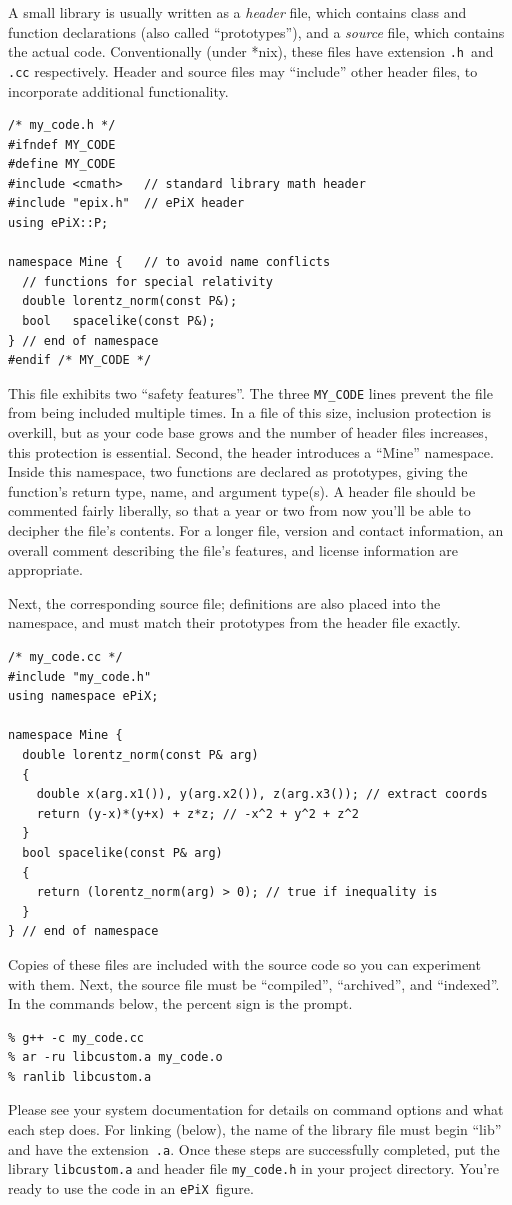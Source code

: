 \documentclass[12pt,letterpaper]{book}
\newcommand{\code}[1]{\texttt{#1}}
\newcommand{\filename}[1]{\texttt{#1}}
\newcommand{\ePiX}{\code{ePiX}}
\begin{document}
A small library is usually written as a \emph{header} file, which
contains class and function declarations (also called ``prototypes''),
and a \emph{source} file, which contains the actual
code. Conventionally (under *nix), these files have extension
\filename{.h}~and \filename{.cc} respectively. Header and source files
may ``include'' other header files, to incorporate additional
functionality.
\begin{verbatim}
/* my_code.h */
#ifndef MY_CODE
#define MY_CODE
#include <cmath>   // standard library math header
#include "epix.h"  // ePiX header
using ePiX::P;

namespace Mine {   // to avoid name conflicts
  // functions for special relativity
  double lorentz_norm(const P&);
  bool   spacelike(const P&);
} // end of namespace
#endif /* MY_CODE */
\end{verbatim}
This file exhibits two ``safety features''. The three \code{MY\_CODE}
lines prevent the file from being included multiple times. In a file
of this size, inclusion protection is overkill, but as your code base
grows and the number of header files increases, this protection is
essential. Second, the header introduces a ``Mine'' namespace. Inside
this namespace, two functions are declared as prototypes, giving the
function's return type, name, and argument type(s). A header file
should be commented fairly liberally, so that a year or two from now
you'll be able to decipher the file's contents.  For a longer file,
version and contact information, an overall comment describing the
file's features, and license information are appropriate.

Next, the corresponding source file; definitions are also placed into
the namespace, and must match their prototypes from the header file
exactly.
\begin{verbatim}
/* my_code.cc */
#include "my_code.h"
using namespace ePiX;

namespace Mine {
  double lorentz_norm(const P& arg)
  {
    double x(arg.x1()), y(arg.x2()), z(arg.x3()); // extract coords
    return (y-x)*(y+x) + z*z; // -x^2 + y^2 + z^2
  }
  bool spacelike(const P& arg)
  {
    return (lorentz_norm(arg) > 0); // true if inequality is
  }
} // end of namespace
\end{verbatim}
Copies of these files are included with the source code so you can
experiment with them. Next, the source file must be ``compiled'',
``archived'', and ``indexed''. In the commands below, the percent sign
is the prompt.
\begin{verbatim}
% g++ -c my_code.cc
% ar -ru libcustom.a my_code.o
% ranlib libcustom.a
\end{verbatim}
Please see your system documentation for details on command options
and what each step does. For linking (below), the name of the library
file must begin ``lib'' and have the extension~\filename{.a}. Once these
steps are successfully completed, put the library \filename{libcustom.a}
and header file \filename{my\_code.h} in your project directory. You're
ready to use the code in an \ePiX\ figure.
\end{document}
